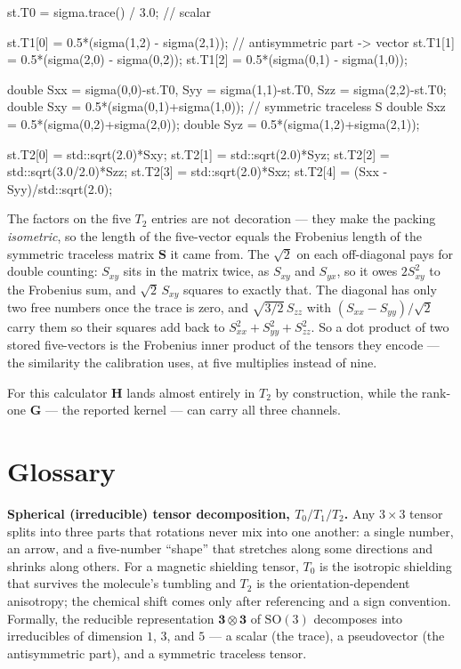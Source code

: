 \documentclass[11pt]{article}
\begin{document}
\begin{codebox}
st.T0 = sigma.trace() / 3.0;                       // scalar

st.T1[0] = 0.5*(sigma(1,2) - sigma(2,1));          // antisymmetric part -> vector
st.T1[1] = 0.5*(sigma(2,0) - sigma(0,2));
st.T1[2] = 0.5*(sigma(0,1) - sigma(1,0));

double Sxx = sigma(0,0)-st.T0, Syy = sigma(1,1)-st.T0, Szz = sigma(2,2)-st.T0;
double Sxy = 0.5*(sigma(0,1)+sigma(1,0));          // symmetric traceless S
double Sxz = 0.5*(sigma(0,2)+sigma(2,0));
double Syz = 0.5*(sigma(1,2)+sigma(2,1));

st.T2[0] = std::sqrt(2.0)*Sxy;     st.T2[1] = std::sqrt(2.0)*Syz;
st.T2[2] = std::sqrt(3.0/2.0)*Szz;
st.T2[3] = std::sqrt(2.0)*Sxz;     st.T2[4] = (Sxx - Syy)/std::sqrt(2.0);
\end{codebox}

The factors on the five \(T_2\) entries are not decoration --- they make the packing
\emph{isometric}, so the length of the five-vector equals the Frobenius length of the
symmetric traceless matrix \(\bm S\) it came from. The \(\sqrt2\) on each off-diagonal
pays for double counting: \(S_{xy}\) sits in the matrix twice, as \(S_{xy}\) and
\(S_{yx}\), so it owes \(2S_{xy}^2\) to the Frobenius sum, and \(\sqrt2\,S_{xy}\) squares
to exactly that. The diagonal has only two free numbers once the trace is zero, and
\(\sqrt{3/2}\,S_{zz}\) with \((S_{xx}-S_{yy})/\sqrt2\) carry them so their squares add
back to \(S_{xx}^2+S_{yy}^2+S_{zz}^2\). So a dot product of two stored five-vectors is the
Frobenius inner product of the tensors they encode --- the similarity the calibration
uses, at five multiplies instead of nine.

For this calculator \(\bm H\) lands almost entirely in \(T_2\) by construction, while the
rank-one \(\bm G\) --- the reported kernel --- can carry all three channels.

\section{Glossary}

\textbf{Spherical (irreducible) tensor decomposition, \(T_0/T_1/T_2\).} Any \(3\times3\)
tensor splits into three parts that rotations never mix into one another: a single
number, an arrow, and a five-number ``shape'' that stretches along some directions and
shrinks along others. For a magnetic shielding tensor, \(T_0\) is the isotropic shielding that survives the
molecule's tumbling and \(T_2\) is the orientation-dependent anisotropy; the chemical
shift comes only after referencing and a sign convention.
Formally, the reducible representation \(\mathbf 3\otimes\mathbf 3\) of
\(\mathrm{SO}(3)\) decomposes into irreducibles of dimension \(1\), \(3\), and \(5\) ---
a scalar (the trace), a pseudovector (the antisymmetric part), and a symmetric traceless
tensor.
\end{document}
